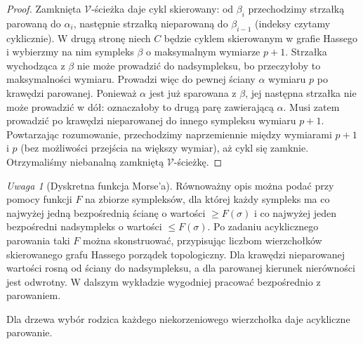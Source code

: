 \documentclass[11pt,a4paper]{report}
\numberwithin{equation}{section}
\theoremstyle{plain}
\theoremstyle{definition}
\theoremstyle{remark}
\newtheorem{uwaga}[twierdzenie]{Uwaga}
\begin{document}
\begin{proof}
Zamknięta $\mathcal V$-ścieżka daje cykl skierowany:
od $\beta_i$ przechodzimy strzałką parowaną do
$\alpha_i$, następnie strzałką nieparowaną do
$\beta_{i-1}$ (indeksy czytamy cyklicznie).
W drugą stronę niech $C$ będzie cyklem skierowanym
w grafie Hassego i wybierzmy na nim sympleks $\beta$
o maksymalnym wymiarze $p+1$. Strzałka wychodząca
z $\beta$ nie może prowadzić do nadsympleksu,
bo przeczyłoby to maksymalności wymiaru. Prowadzi
więc do pewnej ściany $\alpha$ wymiaru $p$ po
krawędzi parowanej. Ponieważ $\alpha$ jest już
sparowana z $\beta$, jej następna strzałka nie może
prowadzić w dół: oznaczałoby to drugą parę zawierającą
$\alpha$. Musi zatem prowadzić po krawędzi
nieparowanej do innego sympleksu wymiaru $p+1$.
Powtarzając rozumowanie, przechodzimy naprzemiennie
między wymiarami $p+1$ i $p$ (bez możliwości przejścia
na większy wymiar), aż cykl się zamknie. Otrzymaliśmy
niebanalną zamkniętą $\mathcal V$-ścieżkę.
\end{proof}

\begin{uwaga}[Dyskretna funkcja Morse'a]
Równoważny opis można podać przy pomocy funkcji
$F$ na zbiorze sympleksów, dla której każdy sympleks
ma co najwyżej jedną bezpośrednią ścianę o wartości
$\ge F(\sigma)$ i co najwyżej jeden bezpośredni
nadsympleks o wartości $\le F(\sigma)$.
Po zadaniu acyklicznego parowania taki $F$ można
skonstruować, przypisując liczbom wierzchołków
skierowanego grafu Hassego porządek topologiczny.
Dla krawędzi nieparowanej wartości rosną od ściany
do nadsympleksu, a dla parowanej kierunek nierówności
jest odwrotny. W dalszym wykładzie wygodniej
pracować bezpośrednio z parowaniem.
\end{uwaga}

\begin{samepage}
\begin{center}
\begin{minipage}{.96\linewidth}\centering
{}\par\smallskip

{\footnotesize Dla drzewa wybór rodzica każdego niekorzeniowego
wierzchołka daje acykliczne parowanie.}
\end{minipage}
\end{center}
\end{samepage}
\end{document}
